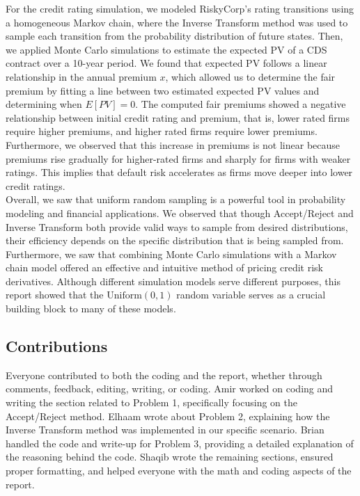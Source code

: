 \documentclass{report}
\begin{document}
For the credit rating simulation, we modeled RiskyCorp's rating transitions using a homogeneous Markov chain, where the Inverse Transform method was used to sample each transition from the probability distribution of future states. Then, we applied Monte Carlo simulations to estimate the expected PV of a CDS contract over a 10-year period. We found that expected PV follows a linear relationship in the annual premium $x$, which allowed us to determine the fair premium by fitting a line between two estimated expected PV values and determining when $E[PV] = 0$. The computed fair premiums showed a negative relationship between initial credit rating and premium, that is, lower rated firms require higher premiums, and higher rated firms require lower premiums. Furthermore, we observed that this increase in premiums is not linear because premiums rise gradually for higher-rated firms and sharply for firms with weaker ratings. This implies that default risk accelerates as firms move deeper into lower credit ratings. \\

Overall, we saw that uniform random sampling is a powerful tool in probability modeling and financial applications. We observed that though Accept/Reject and Inverse Transform both provide valid ways to sample from desired distributions, their efficiency depends on the specific distribution that is being sampled from. Furthermore, we saw that combining Monte Carlo simulations with a Markov chain model offered an effective and intuitive method of pricing credit risk derivatives. Although different simulation models serve different purposes, this report showed that the $\text{Uniform}(0, 1)$ random variable serves as a crucial building block to many of these models.

\subsection*{Contributions}

Everyone contributed to both the coding and the report, whether through comments, feedback, editing, writing, or coding. Amir worked on coding and writing the section related to Problem 1, specifically focusing on the Accept/Reject method. Elhaam wrote about Problem 2, explaining how the Inverse Transform method was implemented in our specific scenario. Brian handled the code and write-up for Problem 3, providing a detailed explanation of the reasoning behind the code. Shaqib wrote the remaining sections, ensured proper formatting, and helped everyone with the math and coding aspects of the report. \\
\end{document}
